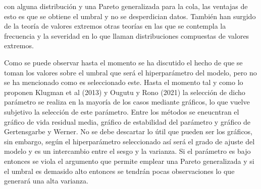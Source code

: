 con alguna distribuci\'on y una Pareto generalizada para la cola, las ventajas de esto es que 
se obtiene el umbral y no se desperdician datos. Tambi\'en han surgido de la teor\'ia de valores
extremos otras teor\'ias en las que se contempla la frecuencia y la severidad en lo que llaman 
distribuciones compuestas de valores extremos. 
\par Como se puede observar hasta el momento se ha discutido el hecho de que se toman los valores
sobre el umbral que ser\'a el hiperpar\'ametro del modelo, pero no se ha mencionado como es seleccionado este. Hasta el momento tal y como 
lo proponen Klugman et al (2013) y  Ougutu y Rono (2021) la selecci\'on de dicho par\'ametro se
realiza en la mayor\'ia de los casos mediante gr\'aficos, lo que vuelve subjetivo la selecci\'on 
de este par\'ametro. Entre los m\'etodos se eneucntran el gr\'afico de vida residual media, gr\'afico
de estabilidad del par\'ametro y gr\'afico de Gertensgarbe y Werner. No se debe descartar lo \'util 
que pueden ser los gr\'aficos, sin embargo, seg\'un el hiperpar\'ametro seleccionado as\'i ser\'a el
grado de ajuste del modelo y es un intercambio entre el sesgo y la varianza. Si el par\'ametro 
es bajo entonces se viola el argumento que permite emplear una Pareto generalizada y si el umbral es 
demasido alto entonces se tendr\'an pocas observaciones lo que generar\'a una alta varianza.